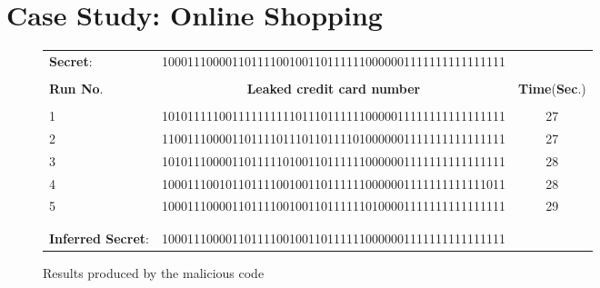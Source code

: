 \documentclass[times, 10pt,twocolumn]{article}
\begin{document}
\section{Case Study: Online Shopping} \label{sec:online-shopping}
\begin{figure}[t]
{\small
\centering
\begin{tabular}{lcc}
{\bf Secret}: & 100011100001101111001001101111110000001111111111111111
& \\ \\
{\bf Run No}. & {\bf Leaked credit card number} & {\bf Time}({\bf Sec}.) \\ \hline \\
1  & 101011111001111111111011101111110000011111111111111111 & 27 \\
2  & 110011100001101111011101101111010000001111111111111111 & 27 \\
3  & 101011100001101111101001101111110000001111111111111111 & 28 \\
4  & 100011100101101111001001101111110000001111111111111011 & 28 \\
5  & 100011100001101111001001101111110100001111111111111111 & 29 \\
\\ \hline \\
{\bf Inferred Secret}:   & 100011100001101111001001101111110000001111111111111111 & \\
\end{tabular}
\caption{Results produced by the malicious code}
\label{table:leakednumbers}
}
\vspace{-10pt}
\end{figure}
\end{document}

